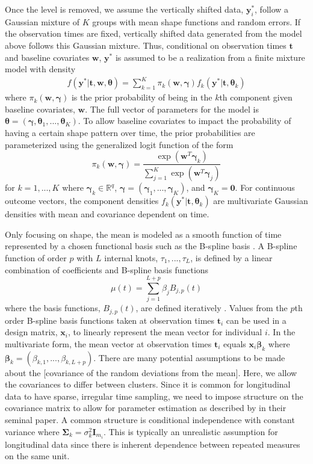 \documentclass[12pt]{article}
\newcommand{\B}[0]{\mathbf}
\newcommand{\BS}[0]{\boldsymbol}
\begin{document}
Once the level is removed, we assume the vertically shifted data, $\B y_{i}^{*}$, follow a Gaussian mixture of $K$ groups with mean shape functions and random errors. If the observation times are fixed, vertically shifted data generated from the model above follows this Gaussian mixture. Thus, conditional on observation times $\B t$ and baseline covariates $\B w$, $\B y^{*}$ is assumed to be a realization from a finite mixture model with density
\begin{align*}
 f(\B y^{*}|\B t,\B w,\BS\theta) =  \sum^{K}_{k=1}\pi_{k}(\B w,\BS \gamma)f_{k}( \B y^{*}|\B t,\BS\theta_{k})
\end{align*}
where $\pi_{k}(\B w,\BS \gamma)$ is the prior probability of being in the $k$th component given baseline covariates, $\B w$. The full vector of parameters for the model is $\BS\theta = (\BS\gamma,\BS\theta_{1},...,\BS\theta_{K})$. To allow baseline covariates to impact the probability of having a certain shape pattern over time, the prior probabilities are parameterized using the generalized logit function of the form
$$\pi_{k}(\B w,\BS\gamma)=\frac{\exp(\B w^{T}\BS\gamma_{k})}{\sum_{j=1}^{K}\exp(\B w^{T}\BS\gamma_{j})}$$ 
for $k=1,...,K$ where $\BS \gamma_{k}\in\mathbb{R}^{q}$, $\BS\gamma = (\BS\gamma_{1},...,\BS\gamma_{K})$, and $\BS\gamma_{K}=\B 0$. For continuous outcome vectors, the component densities $f_{k}(\B y^{*}|\B t,\BS\theta_{k})$ are multivariate Gaussian densities with mean and covariance dependent on time. 

Only focusing on shape, the mean is modeled as a smooth function of time represented by a chosen functional basis such as the B-spline basis \cite{deboor1978, schumaker1981,curry1966, de1976}. A B-spline function of order $p$ with $L$ internal knots, $\tau_{1},...,\tau_{L}$, is defined by a linear combination of coefficients and B-spline basis functions
$$\mu(t) = \sum^{L+p}_{j=1} \beta_j B_{j,p}(t)$$
where the basis functions, $B_{j,p}(t)$, are defined iteratively \cite{deboor1972,cox1972}. Values from the $p$th order B-spline basis functions taken at observation times $\B t_{i}$ can be used in a design matrix, $\B x_{i}$, to linearly represent the mean vector for individual $i$. In the multivariate form, the mean vector at observation times $\B t_{i}$ equals $\B x_{i}\BS\beta_{k}$ where $\BS\beta_{k}=(\beta_{k,1},...,\beta_{k, L+p}).$  
There are many potential assumptions to be made about the [covariance of the random deviations from the mean]. Here, we allow the covariances to differ between clusters. Since it is common for longitudinal data to have sparse, irregular time sampling, we need to impose structure on the covariance matrix to allow for parameter estimation as described by \textcite{jennrich1986} in their seminal paper. A common structure is conditional independence with constant variance where $\B \Sigma_{k}= \sigma_{k}^{2}\B I_{m_{i}}$. This is typically an unrealistic assumption for longitudinal data since there is inherent dependence between repeated measures on the same unit. 
\end{document}
